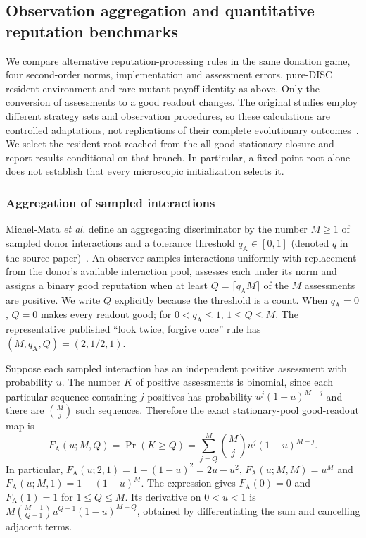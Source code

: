 \documentclass[fleqn,10pt]{wlscirep}
\begin{document}
\subsection{Observation aggregation and quantitative reputation benchmarks}
\label{sec:si-benchmark-mechanisms}

We compare alternative reputation-processing rules in the same donation game, four second-order norms, implementation and assessment errors, pure-DISC resident environment and rare-mutant payoff identity as above. Only the conversion of assessments to a good readout changes. The original studies employ different strategy sets and observation procedures, so these calculations are controlled adaptations, not replications of their complete evolutionary outcomes~\cite{si-michelmata2024,si-schmid2023}. We select the resident root reached from the all-good stationary closure and report results conditional on that branch. In particular, a fixed-point root alone does not establish that every microscopic initialization selects it.

\subsubsection{Aggregation of sampled interactions}
\label{sec:si-aggregation}

Michel-Mata \textit{et al.} define an aggregating discriminator by the number $M\geq1$ of sampled donor interactions and a tolerance threshold $q_{\mathrm A}\in[0,1]$ (denoted $q$ in the source paper)~\cite{si-michelmata2024}. An observer samples interactions uniformly with replacement from the donor's available interaction pool, assesses each under its norm and assigns a binary good reputation when at least $Q=\lceil q_{\mathrm A}M\rceil$ of the $M$ assessments are positive. We write $Q$ explicitly because the threshold is a count. When $q_{\mathrm A}=0$, $Q=0$ makes every readout good; for $0<q_{\mathrm A}\leq1$, $1\leq Q\leq M$. The representative published ``look twice, forgive once'' rule has $(M,q_{\mathrm A},Q)=(2,1/2,1)$.

Suppose each sampled interaction has an independent positive assessment with probability $u$. The number $K$ of positive assessments is binomial, since each particular sequence containing $j$ positives has probability $u^j(1-u)^{M-j}$ and there are ${M\choose j}$ such sequences. Therefore the exact stationary-pool good-readout map is
\begin{equation}
F_{\mathrm A}(u;M,Q)
=\Pr(K\geq Q)
=\sum_{j=Q}^{M}{M\choose j}u^j(1-u)^{M-j}.
\label{eq:si-aggregation-map}
\end{equation}
In particular, $F_{\mathrm A}(u;2,1)=1-(1-u)^2=2u-u^2$, $F_{\mathrm A}(u;M,M)=u^M$ and $F_{\mathrm A}(u;M,1)=1-(1-u)^M$. The expression gives $F_{\mathrm A}(0)=0$ and $F_{\mathrm A}(1)=1$ for $1\leq Q\leq M$. Its derivative on $0<u<1$ is $M{M-1\choose Q-1}u^{Q-1}(1-u)^{M-Q}$, obtained by differentiating the sum and cancelling adjacent terms.
\end{document}
